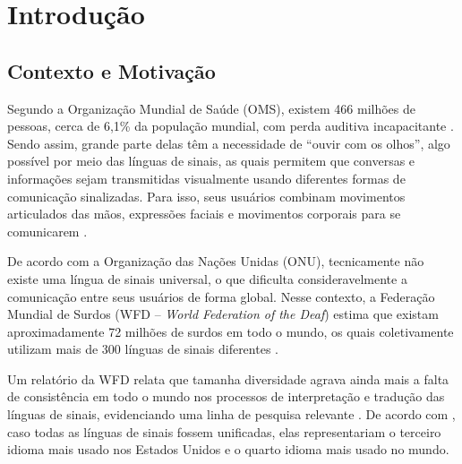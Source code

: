 \chapter{Introdução}
\label{chapter:introducao}

\section{Contexto e Motivação}



Segundo a Organização Mundial de Saúde (OMS), existem 466 milhões de pessoas, cerca de 6,1\% da população mundial, com perda auditiva incapacitante \cite{OMS2018}. Sendo assim, grande parte delas têm a necessidade de ``ouvir com os olhos'', algo possível por meio das línguas de sinais, as quais permitem que conversas e informações sejam transmitidas visualmente usando diferentes formas de comunicação sinalizadas. Para isso, seus usuários combinam movimentos articulados das mãos, expressões faciais e movimentos corporais para se comunicarem \cite{Duke2009}.

De acordo com a Organização das Nações Unidas (ONU), tecnicamente não existe uma língua de sinais universal, o que dificulta consideravelmente a comunicação entre seus usuários de forma global. Nesse contexto, a Federação Mundial de Surdos (WFD -- \textit{World Federation of the Deaf}) estima que existam aproximadamente 72 milhões de surdos em todo o mundo, os quais coletivamente utilizam mais de 300 línguas de sinais diferentes \cite{ONU2019}.

Um relatório da WFD relata que tamanha diversidade agrava ainda mais a falta de consistência em todo o mundo nos processos de interpretação e tradução das línguas de sinais, evidenciando uma linha de pesquisa relevante \cite{Napier2019}. De acordo com , caso todas as línguas de sinais fossem unificadas, elas representariam o terceiro idioma mais usado nos Estados Unidos e o quarto idioma mais usado no mundo.

